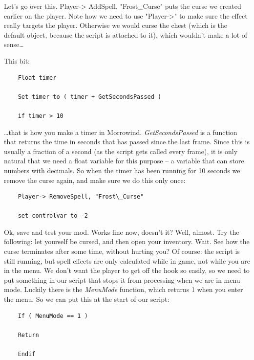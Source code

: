

Let's go over this. Player-> AddSpell, "Frost\_Curse" puts the curse we created earlier on the player. Note how we need to use "Player->" to make sure the effect really targets the player. Otherwise we would curse the chest (which is the default object, because the script is attached to it), which wouldn't make a lot of sense\ldots{}


This bit:

\begin{lstlisting}
	Float timer
	
	Set timer to ( timer + GetSecondsPassed )
	
	if timer > 10
\end{lstlisting}

\ldots that is how you make a timer in Morrowind. \emph{GetSecondsPassed} is a function that returns the time in seconds that has passed since the last frame. Since this is usually a fraction of a second (as the script gets called every frame), it is only natural that we need a float variable for this purpose -- a variable that can store numbers with decimals. So when the timer has been running for 10 seconds we remove the curse again, and make sure we do this only once:


\begin{lstlisting}
	Player-> RemoveSpell, "Frost\_Curse"
	
	set controlvar to -2
\end{lstlisting}

Ok, save and test your mod. Works fine now, doesn't it? Well, almost. Try the following: let yourself be cursed, and then open your inventory. Wait. See how the curse terminates after some time, without hurting you? Of course: the script is still running, but spell effects are only calculated while in game, not while you are in the menu. We don't want the player to get off the hook so easily, so we need to put something in our script that stops it from processing when we are in menu mode. Luckily there is the \emph{MenuMode} function, which returns 1 when you enter the menu. So we can put this at the start of our script:


\begin{lstlisting}
	If ( MenuMode == 1 )
	
	Return
	
	Endif
\end{lstlisting}

